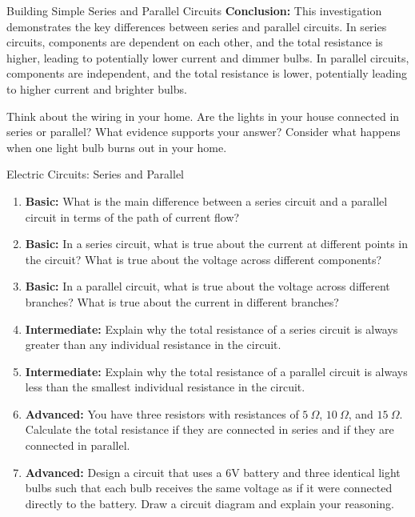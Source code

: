 \begin{investigation}{Building Simple Series and Parallel Circuits}
\textbf{Conclusion:}
This investigation demonstrates the key differences between series and parallel circuits. In series circuits, components are dependent on each other, and the total resistance is higher, leading to potentially lower current and dimmer bulbs. In parallel circuits, components are independent, and the total resistance is lower, potentially leading to higher current and brighter bulbs.
\end{investigation}


\begin{stopandthink}
Think about the wiring in your home. Are the lights in your house connected in series or parallel? What evidence supports your answer? Consider what happens when one light bulb burns out in your home.
\end{stopandthink}

\begin{tieredquestions}{Electric Circuits: Series and Parallel}

\begin{enumerate}
    \item \textbf{Basic:} What is the main difference between a series circuit and a parallel circuit in terms of the path of current flow?
    \item \textbf{Basic:} In a series circuit, what is true about the current at different points in the circuit? What is true about the voltage across different components?
    \item \textbf{Basic:} In a parallel circuit, what is true about the voltage across different branches? What is true about the current in different branches?
    \item \textbf{Intermediate:} Explain why the total resistance of a series circuit is always greater than any individual resistance in the circuit.
    \item \textbf{Intermediate:} Explain why the total resistance of a parallel circuit is always less than the smallest individual resistance in the circuit.
    \item \textbf{Advanced:} You have three resistors with resistances of $5\ \Omega$, $10\ \Omega$, and $15\ \Omega$. Calculate the total resistance if they are connected in series and if they are connected in parallel.
    \item \textbf{Advanced:}  Design a circuit that uses a 6V battery and three identical light bulbs such that each bulb receives the same voltage as if it were connected directly to the battery. Draw a circuit diagram and explain your reasoning. 
\end{enumerate}

\end{tieredquestions}


